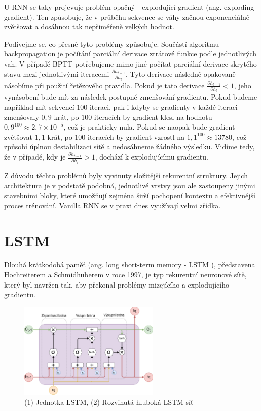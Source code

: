 U RNN se taky projevuje problém opačný - explodující gradient (ang. exploding
gradient). Ten způsobuje, že v průběhu sekvence se váhy začnou exponenciálně
zvětšovat a dosáhnou tak nepřiměřeně velkých hodnot.

Podívejme se, co přesně tyto problémy způsobuje. Součástí algoritmu
backpropagation je počítání parciální derivace ztrátové funkce podle
jednotlivých vah. V případě BPTT potřebujeme mimo jiné počítat parciální
derivace skrytého stavu mezi jednotlivými iteracemi $\frac{\partial
        h_{t-1}}{\partial h_t}$. Tyto derivace následně opakovaně násobíme při použití
řetězového pravidla. Pokud je tato derivace $\frac{\partial h_{t-1}}{\partial
        h_t}<1$, jeho vynásobení bude mít za následek postupné zmenšování gradientu.
Pokud budeme například mít sekvencí $100$ iteraci, pak i kdyby se gradienty v
každé iteraci zmenšovaly $0,9$ krát, po $100$ iteracích by gradient klesl na
hodnotu $0,9^{100} \approx 2,7 \times 10^{-5}$, což je prakticky nula. Pokud se
naopak bude gradient zvětšovat $1,1$ krát, po $100$ iteracích by gradient
vzrostl na $1,1^{100} \approx 13 780$, což způsobí úplnou destabilizaci sítě a
nedosáhneme žádného výsledku. Vidíme tedy, že v případě, kdy je $\frac{\partial
        h_{t-1}}{\partial h_t}>1$, dochází k explodujícímu gradientu.

Z důvodu těchto problémů byly vyvinuty složitější rekurentní struktury. Jejich
architektura je v podstatě podobná, jednotlivé vrstvy jsou ale zastoupeny
jinými stavebními bloky, které umožňují zejména širší pochopení kontextu a
efektivnější proces trénování. Vanilla RNN se v praxi dnes využívají velmi
zřídka.

\section{LSTM}

Dlouhá krátkodobá paměť (ang. long short-term memory - LSTM ), představena
Hochreiterem a Schmidhuberem v roce 1997, je typ rekurentní neuronové sítě,
který byl navržen tak, aby překonal problémy mizejícího a explodujícího
gradientu.

\begin{figure}[]
    \centering
    \includegraphics[width=0.6\textwidth]{Figures/LSTM_unit.pdf}
    \caption{(1) Jednotka LSTM, (2) Rozvinutá hluboká LSTM síť}
    \label{fig:lstm}
\end{figure}

